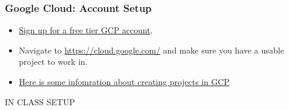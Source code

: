 \documentclass[aspectratio=169]{beamer}
\begin{document}

\begin{frame}
	\frametitle{Google Cloud: Account Setup}
	\begin{itemize}
		\item \href{https://cloud.google.com/free}{Sign up for a free tier GCP account}.
		\item Navigate to \href{https://cloud.google.com/}{https://cloud.google.com/} and make sure you have a usable project to work in.
		\item \href{https://cloud.google.com/resource-manager/docs/creating-managing-projects}{Here is some infomration about creating projects in GCP}
	\end{itemize}
\end{frame}


\begin{frame}
	\Huge \textcolor{dgreen}{IN CLASS SETUP}
\end{frame}
                                                                          
\end{document}
